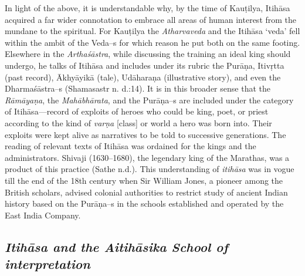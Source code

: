 In light of the above, it is understandable why, by the time of Kauṭilya, Itihāsa acquired a far wider connotation to embrace all areas of human interest from the mundane to the spiritual. For Kauṭilya the \textit{Atharvaveda} and the Itihāsa ‘veda’ fell within the ambit of the Veda–s for which reason he put both on the same footing. Elsewhere in the \textit{Arthaśāstra}, while discussing the training an ideal king should undergo, he talks of Itihāsa and includes under its rubric the Purāṇa, Itivṛtta (past record), Ākhyāyikā (tale), Udāharaṇa (illustrative story), and even the Dharmaśāstra–s (Shamasastr n. d.:14). It is in this broader sense that the \textit{Rāmāyaṇa}, the \textit{Mahābhārata}, and the Purāṇa–s are included under the category of Itihāsa—record of exploits of heroes who could be king, poet, or priest according to the kind of \textit{varṇa} [class] or world a hero was born into. Their exploits were kept alive as narratives to be told to successive generations. The reading of relevant texts of Itihāsa was ordained for the kings and the administrators. Shivaji (1630–1680), the legendary king of the Marathas, was a product of this practice (Sathe n.d.). This understanding of \textit{itihāsa} was in vogue till the end of the 18th century when Sir William Jones, a pioneer among the British scholars, advised colonial authorities to restrict study of ancient Indian history based on the Purāṇa–s in the schools established and operated by the East India Company.


\subsection*{\textit{Itihāsa and the Aitihāsika School of interpretation}}

